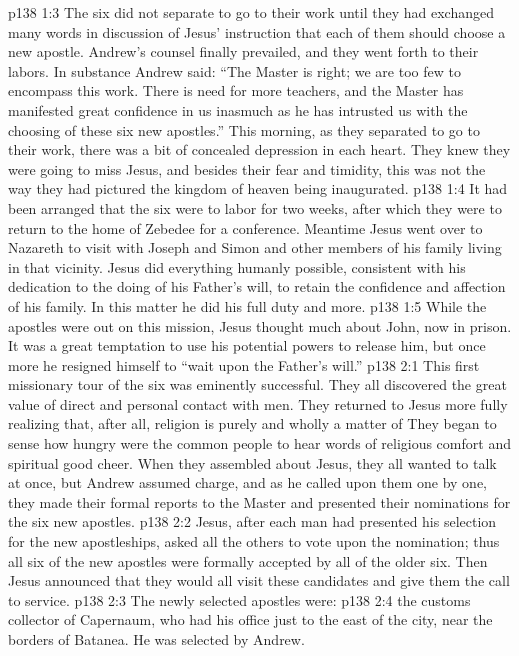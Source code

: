 \vs p138 1:3 The six did not separate to go to their work until they had exchanged many words in discussion of Jesus’ instruction that each of them should choose a new apostle. Andrew’s counsel finally prevailed, and they went forth to their labors. In substance Andrew said: “The Master is right; we are too few to encompass this work. There is need for more teachers, and the Master has manifested great confidence in us inasmuch as he has intrusted us with the choosing of these six new apostles.” This morning, as they separated to go to their work, there was a bit of concealed depression in each heart. They knew they were going to miss Jesus, and besides their fear and timidity, this was not the way they had pictured the kingdom of heaven being inaugurated.
\vs p138 1:4 It had been arranged that the six were to labor for two weeks, after which they were to return to the home of Zebedee for a conference. Meantime Jesus went over to Nazareth to visit with Joseph and Simon and other members of his family living in that vicinity. Jesus did everything humanly possible, consistent with his dedication to the doing of his Father’s will, to retain the confidence and affection of his family. In this matter he did his full duty and more.
\vs p138 1:5 While the apostles were out on this mission, Jesus thought much about John, now in prison. It was a great temptation to use his potential powers to release him, but once more he resigned himself to \textcolor{ubdarkred}{“wait upon the Father’s will.”}
\vs p138 2:1 This first missionary tour of the six was eminently successful. They all discovered the great value of direct and personal contact with men. They returned to Jesus more fully realizing that, after all, religion is purely and wholly a matter of  They began to sense how hungry were the common people to hear words of religious comfort and spiritual good cheer. When they assembled about Jesus, they all wanted to talk at once, but Andrew assumed charge, and as he called upon them one by one, they made their formal reports to the Master and presented their nominations for the six new apostles.
\vs p138 2:2 Jesus, after each man had presented his selection for the new apostleships, asked all the others to vote upon the nomination; thus all six of the new apostles were formally accepted by all of the older six. Then Jesus announced that they would all visit these candidates and give them the call to service.
\vs p138 2:3 The newly selected apostles were:
\pc \vs p138 2:4 \bibnobreakspace {} the customs collector of Capernaum, who had his office just to the east of the city, near the borders of Batanea. He was selected by Andrew.
